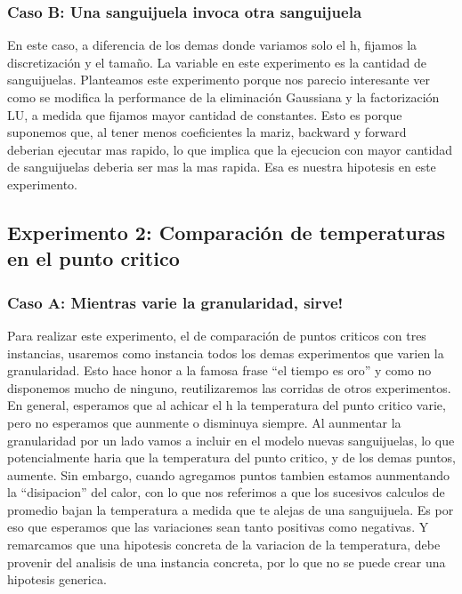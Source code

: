 \subsubsection{Caso B: Una sanguijuela invoca otra sanguijuela}

En este caso, a diferencia de los demas donde variamos solo el h, fijamos la discretizaci\'on y el tama\~no.
La variable en este experimento 
es la cantidad de sanguijuelas. Planteamos este experimento porque nos parecio interesante ver como se modifica 
la performance de la eliminaci\'on 
Gaussiana y la factorizaci\'on LU, a medida que fijamos mayor cantidad de constantes. Esto es porque 
suponemos que, al tener menos coeficientes la mariz, backward y forward deberian ejecutar mas rapido, 
lo que implica que la ejecucion con mayor cantidad de sanguijuelas deberia ser mas la mas rapida.
Esa es nuestra hipotesis en este experimento.

\subsection{Experimento 2: Comparaci\'on de temperaturas en el punto critico}

\subsubsection{Caso A: \textexclamdown Mientras varie la granularidad, sirve!}

Para realizar este experimento, el de comparaci\'on de puntos criticos con tres instancias, usaremos como instancia todos los demas experimentos que varien la granularidad.
Esto hace honor a la famosa frase ``el tiempo es oro'' y como no disponemos mucho de ninguno, 
reutilizaremos las corridas de otros experimentos. En general, esperamos que al achicar el h la 
temperatura del punto critico varie, pero no esperamos que aunmente o disminuya siempre. Al 
aunmentar la granularidad por un lado vamos a incluir en el modelo nuevas sanguijuelas, lo que
potencialmente haria que la temperatura del punto critico, y de los demas puntos, aumente. Sin embargo,
cuando agregamos puntos tambien estamos aunmentando la ``disipacion'' del calor, con lo que 
nos referimos a que los sucesivos calculos de promedio bajan la temperatura a medida que te alejas de 
una sanguijuela. Es por eso que esperamos que las variaciones sean tanto positivas como negativas. Y
remarcamos que una hipotesis concreta de la variacion de la temperatura, debe provenir del analisis de 
una instancia concreta, por lo que no se puede crear una hipotesis generica.


